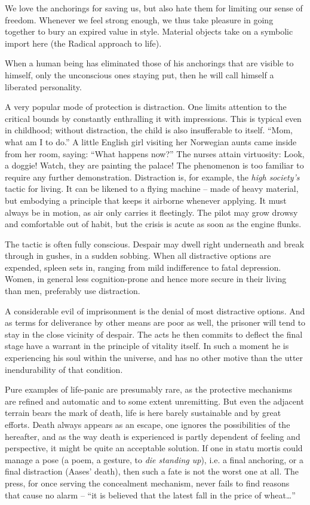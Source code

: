 \documentclass[draft,a4paper,10pt,twocolumn]{article}
\begin{document}
We love the anchorings for saving us, but also hate them for limiting our sense of freedom. Whenever we feel strong enough, we thus take pleasure in going together to bury an expired value in style. Material objects take on a symbolic import here (the Radical approach to life).

When a human being has eliminated those of his anchorings that are visible to himself, only the unconscious ones staying put, then he will call himself a liberated personality.

A very popular mode of protection is distraction. One limits attention to the
critical bounds by constantly enthralling it with impressions. This is typical
even in childhood; without distraction, the child is also insufferable to
itself. \enquote{Mom, what am I to do.} A little English girl visiting her
Norwegian aunts came inside from her room, saying: \enquote{What happens now?}
The nurses attain virtuosity: Look, a doggie! Watch, they are painting the
palace! The phenomenon is too familiar to require any further demonstration.
Distraction is, for example, the \emph{high society's} tactic for living. It can be likened to a flying machine -- made of heavy material, but embodying a principle that keeps it airborne whenever applying. It must always be in motion, as air only carries it fleetingly. The pilot may grow drowsy and comfortable out of habit, but the crisis is acute as soon as the engine flunks.

The tactic is often fully conscious. Despair may dwell right underneath and break through in gushes, in a sudden sobbing. When all distractive options are expended, spleen sets in, ranging from mild indifference to fatal depression. Women, in general less cognition-prone and hence more secure in their living than men, preferably use distraction.

A considerable evil of imprisonment is the denial of most distractive options. And as terms for deliverance by other means are poor as well, the prisoner will tend to stay in the close vicinity of despair. The acts he then commits to deflect the final stage have a warrant in the principle of vitality itself. In such a moment he is experiencing his soul within the universe, and has no other motive than the utter inendurability of that condition.

Pure examples of life-panic are presumably rare, as the protective mechanisms are refined and automatic and to some extent unremitting. But even the adjacent terrain bears the mark of death, life is here barely sustainable and by great efforts. Death always appears as an escape, one ignores the possibilities of the hereafter, and as the way death is experienced is partly dependent of feeling and perspective, it might be quite an acceptable solution. If one in statu mortis could manage a pose (a poem, a gesture, to \emph{die standing up}), i.e. a final anchoring, or a final distraction (Aases' death), then such a fate is not the worst one at all. The press, for once serving the concealment mechanism, never fails to find reasons that cause no alarm -- \enquote{it is believed that the latest fall in the price of wheat…}
\end{document}
